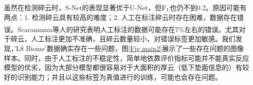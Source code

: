 \documentclass[10pt]{ctexart}
\newcommand{\upcite}[1]{\textsuperscript{\textsuperscript{\cite{#1}}}}
\begin{document}
\begin{multicols}{2}

虽然在检测碎云时，S-Net的表现显著优于U-Net，但$\rm F_1$也仍不到0.2。原因可能有两点：1. 检测碎云具有较高的难度；2. 人工在标注碎云时存在困难，数据存在错误。Scaramuzza等人\upcite{scaramuzza2011development}的研究表明人工标注的数据可能存在7\%左右的错误。尤其对于碎云，人工标注更加不准确，且碎云数量较小，对错误标签更加敏感。我们发现，'L8 Biome'数据确实存在一些问题，图\ref{Fig.main2}展示了一些存在问题的图像样本。同时，由于人工标注的不稳定性，简单地依靠评价指标可能并不能真实反应模型的优劣，因为大部分模型都很容易对于大面积的厚云（低下垫面信息的）有较好的识别能力；并且以这些标签为真值进行的训练，可能也会存在问题。

\begin{figure}[H]
    \centering
\end{figure}
\end{multicols}
\end{document}
